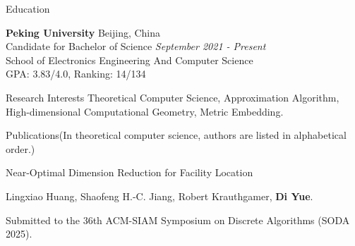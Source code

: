 \documentclass{resume} %
\begin{document}

\begin{rSection}{Education}

{\bf Peking University} \hfill {Beijing, China} 
\\ Candidate for Bachelor of Science \hfill {\em September 2021 - Present}
\\ School of Electronics Engineering And Computer Science
\\ GPA: 3.83/4.0, Ranking: 14/134



\end{rSection}

\begin{rSection}{Research Interests}{}
Theoretical Computer Science, Approximation Algorithm, High-dimensional Computational Geometry, Metric Embedding.
\end{rSection}

\begin{rSection}{Publications}{(In theoretical computer science, authors are listed in alphabetical order.)}

    \begin{pubSubsection}{Near-Optimal Dimension Reduction for Facility Location}
        \item Lingxiao Huang, Shaofeng H.-C. Jiang, Robert Krauthgamer, \textbf{Di Yue}.
        \item Submitted to the 36th ACM-SIAM Symposium on Discrete Algorithms (SODA 2025).
    \end{pubSubsection}
\end{rSection}
\end{document}
